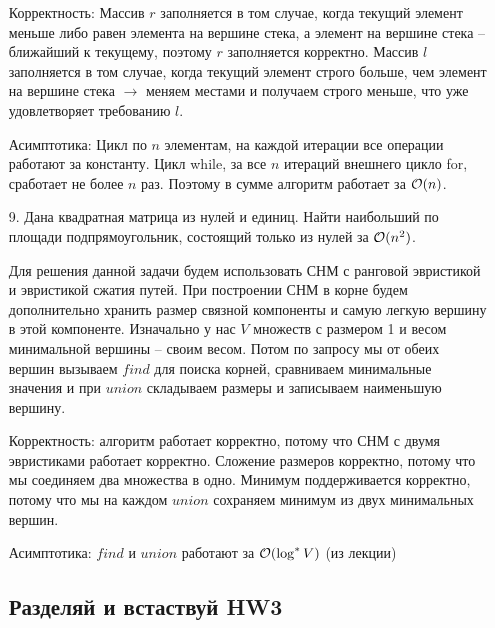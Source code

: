 \begin{enumerate}
\begin{solution}
        Корректность:
        Массив $r$ заполняется в том случае, когда текущий элемент меньше либо равен элемента на вершине стека, а элемент на вершине стека -- ближайший к текущему, поэтому $r$ заполняется корректно. Массив $l$ заполняется в том случае, когда текущий элемент строго больше, чем элемент на вершине стека $\rightarrow$ меняем местами и получаем строго меньше, что уже удовлетворяет требованию $l$.

        Асимптотика:
        Цикл по $n$ элементам, на каждой итерации все операции работают за константу. Цикл while, за все $n$ итераций внешнего цикло for, сработает не более $n$ раз. Поэтому в сумме алгоритм работает за $\mathcal{O}(n)$.

    \end{solution}

    \item[9.]
        Дана квадратная матрица из нулей и единиц. Найти наибольший по площади
        подпрямоугольник, состоящий только из нулей за $\mathcal{O}(n^2)$.
    
    \begin{solution}
        Для решения данной задачи будем использовать СНМ с ранговой эвристикой и эвристикой сжатия путей. При построении СНМ в корне будем дополнительно хранить размер связной компоненты и самую легкую вершину в этой компоненте. Изначально у нас $V$ множеств с размером 1 и весом минимальной вершины -- своим весом. Потом по запросу мы от обеих вершин вызываем $find$ для поиска корней, сравниваем минимальные значения и при $union$ складываем размеры и записываем наименьшую вершину.
        
        Корректность: алгоритм работает корректно, потому что СНМ с двумя эвристиками работает корректно. Сложение размеров корректно, потому что мы соединяем два множества в одно. Минимум поддерживается корректно, потому что мы на каждом $union$ сохраняем минимум из двух минимальных вершин.
        
        Асимптотика: $find$ и $union$ работают за $\mathcal{O}(\log^* V)$ (из лекции)
    \end{solution}
        
\subsection{Разделяй и встаствуй HW3}

\end{enumerate}
    